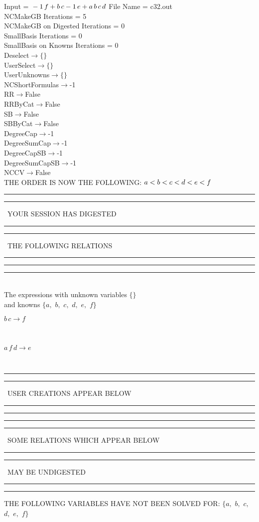 \documentclass[rep10,leqno]{report}
\begin{document}
\normalsize
\baselineskip=12pt
\noindent
Input = 
$
\\-1\,
 f + b\,
 c\\
-1\,
 e + a\,
 b\,
 c\,
 d\\
$
File Name = c32.out\\
NCMakeGB Iterations = 5\\
NCMakeGB on Digested Iterations = 0\\
SmallBasis Iterations = 0\\
SmallBasis on Knowns Iterations = 0\\
Deselect$\rightarrow \{\}$\\
UserSelect$\rightarrow \{\}$\\
UserUnknowns$\rightarrow \{\}$\\
NCShortFormulas$\rightarrow$-1\\
RR$\rightarrow $False\\
RRByCat$\rightarrow $False\\
SB$\rightarrow $False\\
SBByCat$\rightarrow $False\\
DegreeCap$\rightarrow $-1\\
DegreeSumCap$\rightarrow $-1\\
DegreeCapSB$\rightarrow $-1\\
DegreeSumCapSB$\rightarrow $-1\\
NCCV$\rightarrow $False\\
THE ORDER IS NOW THE FOLLOWING:\hfil\break
$
a<b<c<d<e<f\\
$
\rule[2pt]{6in}{4pt}\hfil\break
\rule[2pt]{1.879in}{4pt}
\ YOUR SESSION HAS DIGESTED\ 
\rule[2pt]{1.879in}{4pt}\hfil\break
\rule[2pt]{1.923in}{4pt}
\ THE FOLLOWING RELATIONS\ 
\rule[2pt]{1.923in}{4pt}\hfil\break
\rule[2pt]{6in}{4pt}\hfil\break
\rule[3pt]{6in}{.7pt}\\
The expressions with unknown variables $\{\}$\\
and knowns $\{a,
$ $
b,
$ $
c,
$ $
d,
$ $
e,
$ $
f\}$\smallskip\\
\begin{minipage}{6in}
$
b\,
 c\rightarrow f
$
\end{minipage}\medskip \\
\begin{minipage}{6in}
$
a\,
 f\,
 d\rightarrow e
$
\end{minipage}\\
\rule[2pt]{6in}{1pt}\hfil\break
\rule[2.5pt]{1.701in}{1pt}
\ USER CREATIONS APPEAR BELOW\ 
\rule[2.5pt]{1.701in}{1pt}\hfil\break
\rule[2pt]{6in}{1pt}\hfil\break
\rule[2pt]{6in}{4pt}\hfil\break
\rule[2pt]{1.45in}{4pt}
\ SOME RELATIONS WHICH APPEAR BELOW\ 
\rule[2pt]{1.45in}{4pt}\hfil\break
\rule[2pt]{2.18in}{4pt}
\ MAY BE UNDIGESTED\ 
\rule[2pt]{2.18in}{4pt}\hfil\break
\rule[2pt]{6in}{4pt}\hfil\break
THE FOLLOWING VARIABLES HAVE NOT BEEN SOLVED FOR:\hfil\break
$\{a,
$ $
b,
$ $
c,
$ $
d,
$ $
e,
$ $
f\}$
\smallskip\\
\vspace{10pt}
\end{document}
